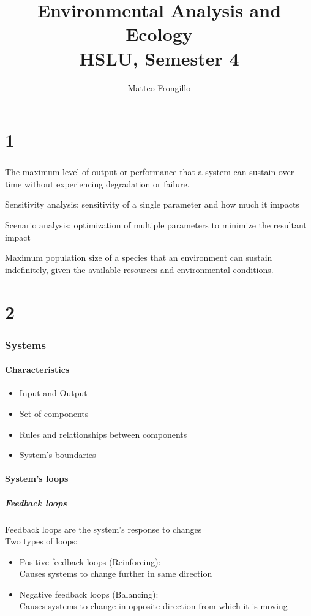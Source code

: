 \documentclass{article}
\title{\textbf{Environmental Analysis and Ecology \\ HSLU, Semester 4}}
\author{Matteo Frongillo}
\date{}
\begin{document}
\maketitle
\tableofcontents
\pagebreak

\part{1}
\section{\todo}
The maximum level of output or performance that a system can sustain over time without experiencing degradation or failure.

Sensitivity analysis: sensitivity of a single parameter and how much it impacts

Scenario analysis: optimization of multiple parameters to minimize the resultant impact

Maximum population size of a species that an environment can sustain indefinitely, given the available resources and environmental conditions.

\part{2}
\section{Systems}
\subsection{Characteristics}
\begin{itemize}
    \item Input and Output
    \item Set of components
    \item Rules and relationships between components
    \item System's boundaries
\end{itemize}

\subsection{System's loops}
\subsubsection{Feedback loops}
Feedback loops are the system's response to changes\\
Two types of loops:
\begin{itemize}
    \item Positive feedback loops (Reinforcing): \\
    Causes systems to change further in same direction
    \item Negative feedback loops (Balancing): \\
    Causes systems to change in opposite direction from which it is moving
\end{itemize}
\end{document}
